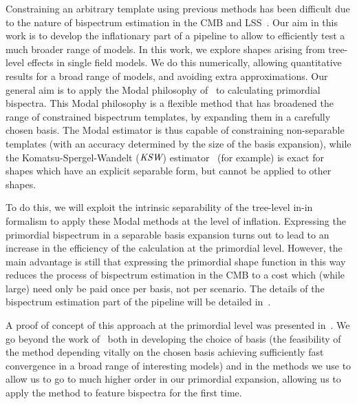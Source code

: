 Constraining an arbitrary template using previous methods has been difficult
due to the nature of bispectrum estimation in the CMB and
LSS~\cite{lss_baldauf,lss_karagiannis,chen_future_lss,Scoccimarro_2012}.
Our aim in this work is to develop the inflationary part
of a pipeline to allow to efficiently test a much broader range of models.
In this work, we explore shapes arising from tree-level effects in single field models.
We do this numerically, allowing quantitative results for a broad
range of models, and avoiding extra approximations.
Our general aim is to apply the Modal philosophy of~\cite{FergShell_1,FergShell_2,FergShell_3}
to calculating primordial bispectra.
This Modal philosophy is a flexible method that has broadened the range of constrained
bispectrum templates, by expanding them in a carefully chosen basis.
The Modal estimator is thus capable of constraining
non-separable templates (with an accuracy determined by the size of the basis expansion),
while the Komatsu-Spergel-Wandelt (${\textit{\text{KSW}}}$) estimator~\cite{Komatsu_2005}
(for example) is exact for shapes which have an explicit separable form,
but cannot be applied to other shapes.


To do this, we will exploit the intrinsic separability of the
tree-level in-in formalism to apply these Modal methods at the level of inflation.
Expressing the primordial bispectrum in a separable
basis expansion turns out to lead to an increase in the efficiency
of the calculation at the primordial level.
However, the main advantage is still that
expressing the primordial shape function
in this way reduces the process of bispectrum estimation in the CMB to a
cost which (while large) need only be paid once per basis,
not per scenario.
The details of the bispectrum estimation part of
the pipeline will be detailed in~\cite{Sohn_2021}.


A proof of concept of this approach at the primordial level was presented in~\cite{Funakoshi}.
We go beyond the work of~\cite{Funakoshi} both in developing the choice of basis
(the feasibility of the method depending vitally on the chosen basis
achieving sufficiently fast convergence in a broad range of interesting models)
and in the methods we use to allow us to go to much higher order in our primordial expansion,
allowing us to apply the method to feature bispectra for the first time.


